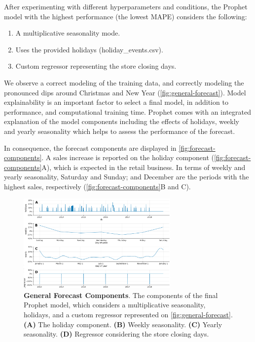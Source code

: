 After experimenting with different hyperparameters and conditions,  the Prophet model with the highest performance (the lowest MAPE) considers the following: 

\begin{enumerate}
\item A multiplicative seasonality mode.
\item Uses the provided holidays (holiday\_events.csv).
\item Custom regressor representing the store closing days.
\end{enumerate}


We observe a correct modeling of the training data, and correctly modeling the pronounced dips around Christmas and New Year (\autoref{fig:general-forecast}). Model explainability is an important factor to select a final model, in addition to performance, and computational training time. Prophet comes with an integrated explanation of the model components including the effects of holidays, weekly and yearly seasonality which helps to assess the performance of the forecast.

In consequence, the forecast components are displayed in \autoref{fig:forecast-components}. A sales increase is reported on the holiday component (\autoref{fig:forecast-components}A), which is expected in the retail business. In terms of weekly and yearly seasonality, Saturday and Sunday; and December are the periods with the highest sales, respectively (\autoref{fig:forecast-components}B and C).

\begin{figure}[!htb]
  \centering
  \includegraphics[width=0.7\textwidth]{plots/forecast/forecast_prophet-components.png}
  \caption[General Forecast Components]{\textbf{General Forecast Components}. The components of the final Prophet model, which considers a multiplicative seasonality, holidays, and a custom regressor represented on \autoref{fig:general-forecast}. \textbf{(A)} The holiday component. \textbf{(B)} Weekly seasonality. \textbf{(C)} Yearly seasonality. \textbf{(D)} Regressor considering the store closing days.}
  \label{fig:forecast-components}
\end{figure}

